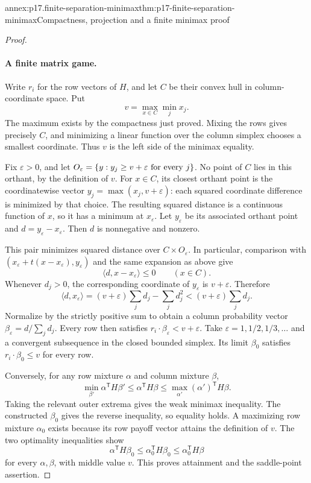 \begin{annexitem}{annex:p17.finite-separation-minimax}{thm:p17-finite-separation-minimax}{Compactness, projection and a finite minimax proof}
\begin{proof}
\paragraph{A finite matrix game.}
Write \(r_i\) for the row vectors of \(H\), and let \(C\) be their
convex hull in column-coordinate space. Put
\[
                        v=\max_{x\in C}\min_j x_j.
\]
The maximum exists by the compactness just proved.
Mixing the rows gives precisely \(C\), and minimizing a linear function
over the column simplex chooses a smallest coordinate. Thus \(v\)
is the left side of the minimax equality.

Fix \(\varepsilon>0\), and let
\(O_\varepsilon=\{y:y_j\geq v+\varepsilon\ \hbox{for every }j\}\).
No point of \(C\) lies in this orthant, by the definition of \(v\).
For \(x\in C\), its closest orthant point is the coordinatewise vector
\(y_j=\max(x_j,v+\varepsilon)\): each squared coordinate difference
is minimized by that choice. The resulting squared distance is a
continuous function of \(x\), so it has a minimum at \(x_\varepsilon\).
Let \(y_\varepsilon\) be its associated orthant point and
\(d=y_\varepsilon-x_\varepsilon\). Then \(d\) is nonnegative and
nonzero.

This pair minimizes squared distance over \(C\times O_\varepsilon\).
In particular, comparison with
\((x_\varepsilon+t(x-x_\varepsilon),y_\varepsilon)\) and the same
expansion as above give
\[
                    \langle d,x-x_\varepsilon\rangle\leq0
                    \qquad(x\in C).
\]
Whenever \(d_j>0\), the corresponding coordinate of \(y_\varepsilon\)
is \(v+\varepsilon\). Therefore
\[
 \langle d,x_\varepsilon\rangle
   =(v+\varepsilon)\sum_jd_j-\sum_jd_j^2
   <(v+\varepsilon)\sum_jd_j.
\]
Normalize by the strictly positive sum to obtain a column probability
vector \(\beta_\varepsilon=d/\sum_jd_j\).
Every row then satisfies \(r_i\cdot\beta_\varepsilon<v+\varepsilon\).
Take \(\varepsilon=1,1/2,1/3,\ldots\) and a convergent subsequence in
the closed bounded simplex. Its limit \(\beta_0\) satisfies
\(r_i\cdot\beta_0\leq v\) for every row.

Conversely, for any row mixture \(\alpha\) and column mixture \(\beta\),
\[
 \min_{\beta'}\alpha^{\mathsf T}H\beta'
       \leq\alpha^{\mathsf T}H\beta
       \leq\max_{\alpha'}(\alpha')^{\mathsf T}H\beta.
\]
Taking the relevant outer extrema gives the weak minimax inequality.
The constructed \(\beta_0\) gives the reverse inequality, so equality
holds. A maximizing row mixture \(\alpha_0\) exists because its row
payoff vector attains the definition of \(v\).
The two optimality inequalities show
\[
 \alpha^{\mathsf T}H\beta_0
 \leq \alpha_0^{\mathsf T}H\beta_0
 \leq \alpha_0^{\mathsf T}H\beta
\]
for every \(\alpha,\beta\), with middle value \(v\).
This proves attainment and the saddle-point assertion.
\end{proof}
\end{annexitem}

